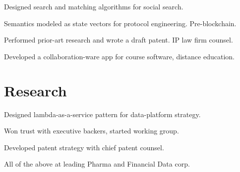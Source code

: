 \documentclass[letterpaper]{deedy-resume} %
\begin{document}
\begin{minipage}[t]{0.66\textwidth}
\sectionspace %



\begin{tightitemize}
\item Designed search and matching algorithms for social search.
\item Semantics modeled as state vectors for protocol engineering.  Pre-blockchain.
\item Performed prior-art research and wrote a draft patent. IP law firm counsel.
\item Developed a collaboration-ware app for course software, distance education.
\end{tightitemize}

\sectionspace %



\section{Research}


\vspace{\topsep} %
\begin{tightitemize}
\item Designed lambda-as-a-service pattern for data-platform strategy.
\item Won trust with executive backers, started working group.
\item Developed patent strategy with chief patent counsel.
\item All of the above at leading Pharma and Financial Data corp.
\end{tightitemize}

\sectionspace %





\end{minipage}
\end{document}

